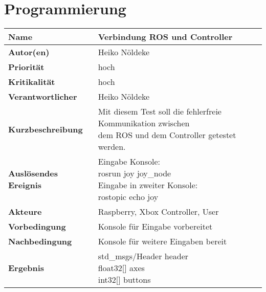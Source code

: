 \section{Programmierung}

\begin{tabularx}{\columnwidth}{|p{4cm}|X|}
	\hline
	\textbf{Name} & Verbindung ROS und Controller\\
	\hline
	\textbf{Autor(en)} & Heiko Nöldeke \\
	\hline
	\textbf{Priorität} & hoch\\	
	\hline	
	\textbf{Kritikalität} & hoch\\
	\hline
	\textbf{Verantwortlicher} & Heiko Nöldeke\\
	\hline
	\textbf{Kurzbeschreibung} & \makecell[tl]{Mit diesem Test soll die fehlerfreie Kommunikation zwischen\\dem ROS und dem Controller getestet werden.} \\
	\hline
	\textbf{Auslösendes Ereignis} &  \makecell[tl]{Eingabe Konsole:\\rosrun joy joy\_node\\Eingabe in zweiter Konsole:\\rostopic echo joy}\\
	\hline
	\textbf{Akteure} & Raspberry, Xbox Controller, User\\
	\hline
	\textbf{Vorbedingung} & Konsole für Eingabe vorbereitet\\
	\hline
	\textbf{Nachbedingung} & Konsole für weitere Eingaben bereit\\
	\hline
	\textbf{Ergebnis} & \makecell[tl]{std\_msgs/Header header\\float32[] axes\\int32[] buttons}\\
	\hline
\end{tabularx}
\label{tab:TestCaseROSController}

\newpage